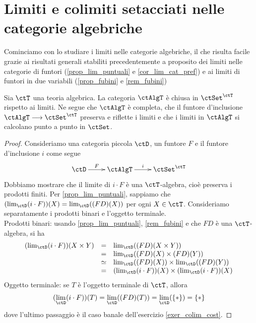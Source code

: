 \section{Limiti e colimiti setacciati nelle categorie algebriche}\label{sec_limcolim_AlgT}

Cominciamo con lo studiare i limiti nelle categorie algebriche, il che risulta facile grazie ai risultati generali stabiliti precedentemente a
proposito dei limiti nelle categorie di funtori (\ref{prop_lim_puntuali} e \ref{cor_lim_cat_pref}) e ai limiti di funtori in
due variabili (\ref{prop_fubini} e \ref{rem_fubini})

\begin{proposition}\label{prop_lim_alg}
 Sia \(\ctT\) una teoria algebrica. La categoria \(\ctAlgT\) è chiusa in \(\ctSet^{\ctT}\) rispetto ai limiti. Ne segue che
 \(\ctAlgT\) è completa, che il funtore d'inclusione \(\ctAlgT \fun \ctSet^{\ctT}\) preserva e riflette i limiti e che
 i limiti in \(\ctAlgT\) si calcolano punto a punto in \(\ctSet\).
\end{proposition}

\begin{proof}
 Consideriamo una categoria piccola \(\ctD\), un funtore \(F\) e il funtore d'inclusione \(i\) come segue
 \[\xymatrix{\ctD \ar[r]^-{F} & \ctAlgT \ar[r]^-{i} & \ctSet^{\ctT}}\]
 Dobbiamo mostrare che il limite di \(i \cdot F\) è una \(\ctT\)-algebra, cioè preserva i prodotti finiti.
 Per \ref{prop_lim_puntuali}, sappiamo che \((\lim_{\ctD}(i \cdot F))(X) = \lim_{\ctD}((FD)(X))\) per ogni \(X \in \ctT\).
 Consideriamo separatamente i prodotti binari e l'oggetto terminale. \\
 Prodotti binari: usando \ref{prop_lim_puntuali}, \ref{rem_fubini} e che \(FD\) è una \(\ctT\)-algebra, si ha
 \[\begin{array}{rcl}
   (\lim_{\ctD}(i \cdot F))(X \times Y) & =      & \lim_{\ctD}((FD)(X \times Y))                                  \\
                                        & =      & \lim_{\ctD}((FD)(X) \times (FD)(Y))                            \\
                                        & \simeq & \lim_{\ctD}((FD)(X)) \times \lim_{\ctD}((FD)(Y))               \\
                                        & =      & (\lim_{\ctD}(i \cdot F))(X) \times (\lim_{\ctD}(i \cdot F))(X)
  \end{array}\]
 Oggetto terminale: se \(T\) è l'oggetto terminale di \(\ctT\), allora
 \[(\lim_{\ctD}(i \cdot F))(T) = \lim_{\ctD}((FD)(T)) = \lim_{\ctD}(\{\ast\}) = \{\ast\}\]
 dove l'ultimo passaggio è il caso banale dell'esercizio \ref{exer_colim_cost}.
\end{proof}

